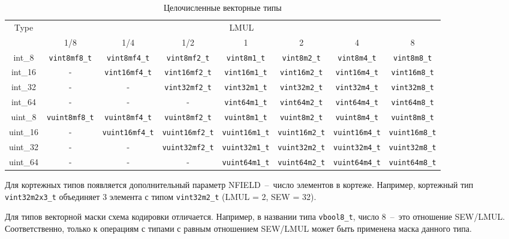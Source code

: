 \begin{table}[h]
\centering
{\scriptsize
\begin{tabular}{|c|c|c|c|c|c|c|c|}
	\hline
	\multirow{2}{*}{Type} & \multicolumn{7}{|c|}{LMUL} \\
	\cline{2-8}  & 1/8 & 1/4 & 1/2 & 1 & 2 & 4 & 8 \\
	\hline
	int\_8 & \texttt{vint8mf8\_t} & \texttt{vint8mf4\_t} & \texttt{vint8mf2\_t} & \texttt{vint8m1\_t} & \texttt{vint8m2\_t} & \texttt{vint8m4\_t} & \texttt{vint8m8\_t} \\
	\hline
	int\_16 & - & \texttt{vint16mf4\_t} & \texttt{vint16mf2\_t} & \texttt{vint16m1\_t} & \texttt{vint16m2\_t} & \texttt{vint16m4\_t} & \texttt{vint16m8\_t} \\
	\hline
	int\_32 & - & - & \texttt{vint32mf2\_t} & \texttt{vint32m1\_t} & \texttt{vint32m2\_t} & \texttt{vint32m4\_t} & \texttt{vint32m8\_t} \\
	\hline
	int\_64 & - & - & - & \texttt{vint64m1\_t} & \texttt{vint64m2\_t} & \texttt{vint64m4\_t} & \texttt{vint64m8\_t} \\
	\hline
	uint\_8 & \texttt{vuint8mf8\_t} & \texttt{vuint8mf4\_t} & \texttt{vuint8mf2\_t} & \texttt{vuint8m1\_t} & \texttt{vuint8m2\_t} & \texttt{vuint8m4\_t} & \texttt{vuint8m8\_t} \\
	\hline
	uint\_16 & - & \texttt{vuint16mf4\_t} & \texttt{vuint16mf2\_t} & \texttt{vuint16m1\_t} & \texttt{vuint16m2\_t} & \texttt{vuint16m4\_t} & \texttt{vuint16m8\_t} \\
	\hline
	uint\_32 & - & - & \texttt{vuint32mf2\_t} & \texttt{vuint32m1\_t} & \texttt{vuint32m2\_t} & \texttt{vuint32m4\_t} & \texttt{vuint32m8\_t} \\
	\hline
	uint\_64 & - & - & - & \texttt{vuint64m1\_t} & \texttt{vuint64m2\_t} & \texttt{vuint64m4\_t} & \texttt{vuint64m8\_t} \\
	\hline
\end{tabular}
}
\caption{Целочисленные векторные типы}
\label{tab:vsew}
\end{table}

Для кортежных типов появляется дополнительный параметр NFIELD~--~число элементов в
кортеже. Например, кортежный тип \texttt{vint32m2x3\_t} объединяет 3 элемента с
типом \texttt{vint32m2\_t} (LMUL = 2, SEW = 32).

Для типов векторной маски схема кодировки отличается. Например, в названии типа
\texttt{vbool8\_t}, число 8~--~это отношение SEW/LMUL. Соответственно, только к
операциям с типами с равным отношением SEW/LMUL может быть применена маска
данного типа.

